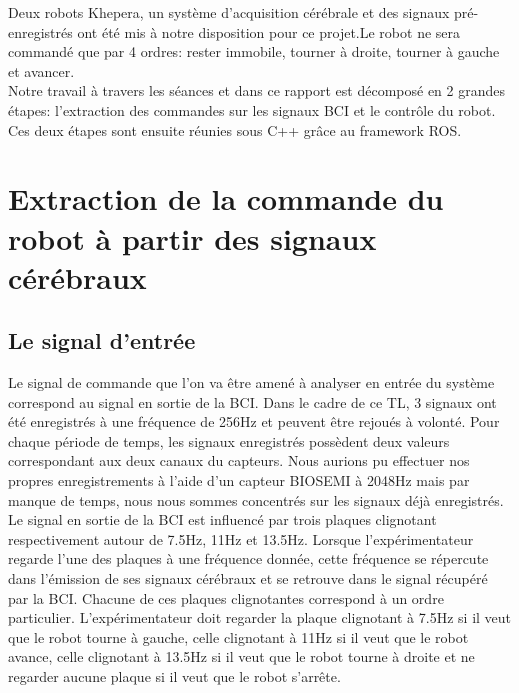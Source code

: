 \documentclass[11pt]{article}
\begin{document}
\noindent Deux robots Khepera, un système d'acquisition cérébrale et des signaux pré-enregistrés ont été mis à notre disposition pour ce projet.Le robot ne sera commandé que par 4 ordres: rester immobile, tourner à droite, tourner à gauche et avancer.\\

\noindent Notre travail à travers les séances et dans ce rapport est décomposé en 2 grandes étapes: l'extraction des commandes sur les signaux BCI et le contrôle du robot. Ces deux étapes sont ensuite réunies sous C++ grâce au framework ROS.


\cleardoublepage


\section{Extraction de la commande du robot à partir des signaux cérébraux}

\subsection{Le signal d'entrée}

Le signal de commande que l'on va être amené à analyser en entrée du système correspond au signal en sortie  de la BCI. Dans le cadre de ce TL, 3 signaux ont été enregistrés à une fréquence de 256Hz et peuvent être rejoués à volonté. Pour chaque période de temps, les signaux enregistrés possèdent deux valeurs correspondant aux deux canaux du capteurs. Nous aurions pu effectuer nos propres enregistrements à l'aide d'un capteur BIOSEMI à 2048Hz mais par manque de temps, nous nous sommes concentrés sur les signaux déjà enregistrés. \\

Le signal en sortie de la BCI est influencé par trois plaques clignotant respectivement autour de 7.5Hz, 11Hz et 13.5Hz. Lorsque l'expérimentateur regarde l'une des plaques à une fréquence donnée, cette fréquence se répercute dans l'émission de ses signaux cérébraux et se retrouve dans le signal récupéré par la BCI. Chacune de ces plaques clignotantes correspond à un ordre particulier. L'expérimentateur doit regarder la plaque clignotant à 7.5Hz si il veut que le robot tourne à gauche, celle clignotant à 11Hz si il veut que le robot avance, celle clignotant à 13.5Hz si il veut que le robot tourne à droite et ne regarder aucune plaque si il veut que le robot s'arrête.
\end{document}
